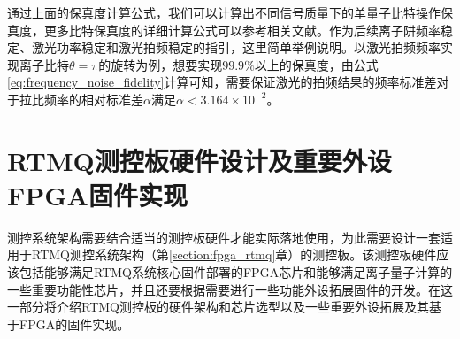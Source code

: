 通过上面的保真度计算公式，我们可以计算出不同信号质量下的单量子比特操作保真度，更多比特保真度的详细计算公式可以参考相关文献\cite[]{van_Dijk_Kawakami_Schouten_Veldhorst_Vandersypen_Babaie_Charbon_Sebastiano_2019}。作为后续离子阱频率稳定、激光功率稳定和激光拍频稳定的指引，这里简单举例说明。以激光拍频频率实现离子比特$\theta=\pi$的旋转为例，想要实现$99.9\%$以上的保真度，由公式\eqref{eq:frequency_noise_fidelity}计算可知，需要保证激光的拍频结果的频率标准差对于拉比频率的相对标准差$\alpha$满足$\alpha < 3.164\times10^{-2}$。











\section[RTMQ测控板硬件设计及重要外设FPGA固件实现]{RTMQ测控板硬件设计及重要外设FPGA固件实现}

测控系统架构需要结合适当的测控板硬件才能实际落地使用，为此需要设计一套适用于RTMQ测控系统架构（第\ref{section:fpga_rtmq}章）的测控板。该测控板硬件应该包括能够满足RTMQ系统核心固件部署的FPGA芯片和能够满足离子量子计算的一些重要功能性芯片，并且还要根据需要进行一些功能外设拓展固件的开发。在这一部分将介绍RTMQ测控板的硬件架构和芯片选型以及一些重要外设拓展及其基于FPGA的固件实现。

